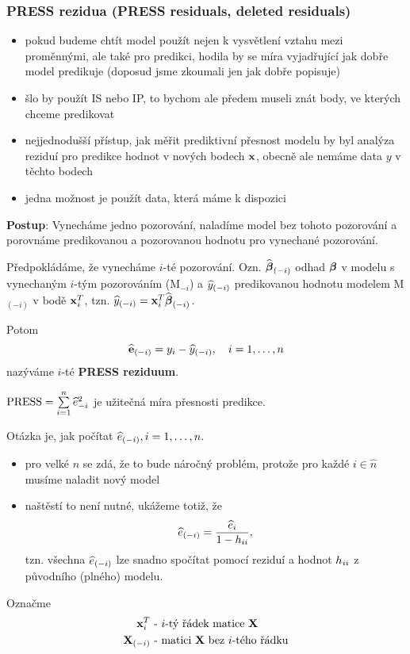 \subsubsection{PRESS rezidua (PRESS residuals, deleted residuals)}
\begin{itemize}
	\item pokud budeme chtít model použít nejen k vysvětlení vztahu mezi proměnnými, ale také pro predikci, hodila by se míra vyjadřující jak dobře model predikuje (doposud jsme zkoumali jen jak dobře popisuje)
	\item šlo by použít IS nebo IP, to bychom ale předem museli znát body, ve kterých chceme predikovat
	\item nejjednodušší přístup, jak měřit prediktivní přesnost modelu by byl analýza reziduí pro predikce hodnot v nových bodech $\textbf{x}$, obecně ale nemáme data $y$ v těchto bodech
	\item jedna možnost je použít data, která máme k dispozici
\end{itemize}

\textbf{Postup}: Vynecháme jedno pozorování, naladíme model bez tohoto pozorování a porovnáme predikovanou a pozorovanou hodnotu pro vynechané pozorování.

Předpokládáme, že vynecháme $i$-té pozorování. Ozn. $\widehat{\boldsymbol{\beta}}_{(-i)}$ odhad $\boldsymbol{\beta}$ v modelu s vynechaným $i$-tým pozorováním (M$_{-i}$) a $\widehat{y}_{(-i)}$ predikovanou hodnotu modelem M$_{(-i)}$ v bodě $\textbf{x}_i^T$, tzn. $\widehat{y}_{(-i)} = \textbf{x}_i^T \widehat{\boldsymbol{\beta}}_{(-i)}$.

Potom
$$
\widehat{\textbf{e}}_{(-i)} = y_i - \widehat{y}_{(-i)}, \quad i = 1, \dots, n
$$
nazýváme $i$-té \textbf{PRESS reziduum}.

$\mathrm{PRESS} = \sum\limits_{i=1}^{n} \widehat{e}_{-i}^2$ je užitečná míra přesnosti predikce.

\begin{remark}
	Otázka je, jak počítat $\widehat{e}_{(-i)}, i = 1, \dots, n$.
	\begin{itemize}
		\item pro velké $n$ se zdá, že to bude náročný problém, protože pro každé $i \in \hat{n}$ musíme naladit nový model
		\item naštěstí to není nutné, ukážeme totiž, že
		$$
		\widehat{e}_{(-i)} = \frac{\widehat{e}_i}{1 - h_{ii}},
		$$
		tzn. všechna $\widehat{e}_{(-i)}$ lze snadno spočítat pomocí reziduí a hodnot $h_{ii}$ z původního (plného) modelu.
	\end{itemize}
\end{remark}

Označme
\begin{align*}
	\textbf{x}_i^T & \text{ - $i$-tý řádek matice } \textbf{X} \\
	\textbf{X}_{(-i)} & \text{ - matici $\textbf{X}$ bez $i$-tého řádku}
\end{align*}

